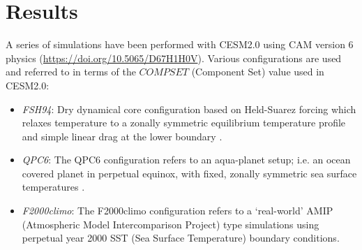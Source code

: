 \documentclass{agujournal}
\begin{document}
\section{Results}
A series of simulations have been performed with CESM2.0 using CAM version 6 physics (\url{https://doi.org/10.5065/D67H1H0V}). Various configurations are used and referred to in terms of the $COMPSET$ (Component Set) value used in CESM2.0: 
\begin{itemize}
\item {\em{FSH94}}: Dry dynamical core configuration based on Held-Suarez forcing which relaxes temperature to a zonally symmetric equilibrium temperature profile and simple linear drag at the lower boundary \citep{HS1994BAMS}. 
\item {\em{QPC6}}: The QPC6 configuration refers to an aqua-planet setup; i.e. an ocean covered planet in perpetual equinox, with fixed, zonally symmetric sea surface temperatures \citep{NH2000ASL,MWO2016JAMES}. 
\item {\em{F2000climo}}: The F2000climo configuration refers to a `real-world' AMIP (Atmospheric Model Intercomparison Project) type simulations using perpetual year 2000 SST (Sea Surface Temperature) boundary conditions.
\end{itemize}
\end{document}
